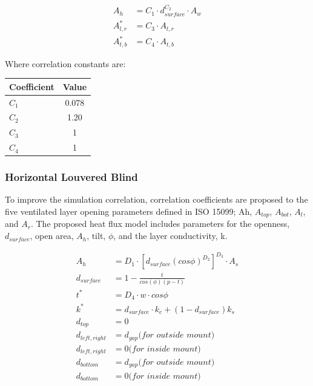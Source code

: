 \begin{equation}
\begin{array}{rl}
A_h & = C_1 \cdot d_{surface}^{C_2} \cdot A_w \\
A_{l,r}^* & = C_3 \cdot A_{l,r} \\
A_{t,b}^* & = C_4 \cdot A_{t,b}
\end{array}
\label{eq:ScreenCorrelations}
\end{equation}

Where correlation constants are:

\begin{tabular}{ l c }
	\hline
	Coefficient & Value \\
	\hline
	\hline
	$C_1$ & 0.078 \\
	$C_2$ & 1.20 \\
	$C_3$ & 1 \\
	$C_4$ & 1 \\
	\hline

\end{tabular}

\subsubsection{Horizontal Louvered Blind}
To improve the simulation correlation, correlation coefficients are proposed to the five ventilated layer opening parameters defined in ISO 15099; Ah, $A_{top}$, $A_{bot}$, $A_l$, and $A_r$. The proposed heat flux model includes parameters for the openness, $d_{surface}$, open area, $A_h$, tilt, $\phi$, and the layer conductivity, k.

\begin{equation}
\begin{array}{rl}
A_h & = D_1 \cdot [d_{surface} (cos\phi)^{D_2}]^{D_3} \cdot A_s \\
d_{surface} & = 1 - \frac{t}{cos(\phi)(p-t)} \\
t^* & = D_4 \cdot w \cdot cos\phi \\
k^* & = d_{surface} \cdot k_c + (1 - d_{surface})k_s \\
d_{top} & = 0 \\
d_{left, right} & = d_{gap} \textit{(for outside mount)} \\
d_{left, right} & = 0 \textit{(for inside mount)} \\
d_{bottom} & = d_{gap} \textit{(for outside mount)} \\
d_{bottom} & = 0 \textit{(for inside mount)} \\
\end{array}
\label{eq:VenetianCorrelations}
\end{equation}


